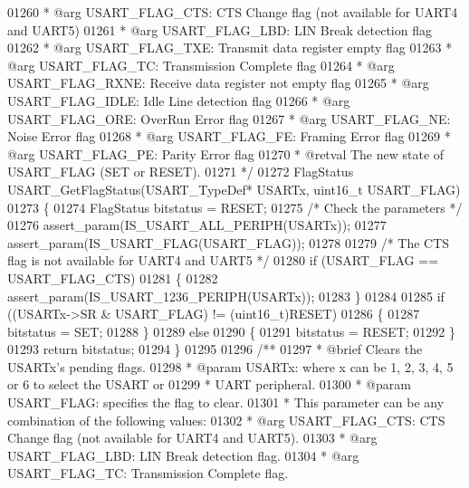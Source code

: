 \begin{DoxyCode}
01260 \textcolor{comment}{  *            @arg USART\_FLAG\_CTS:  CTS Change flag (not available for UART4 and UART5)}
01261 \textcolor{comment}{  *            @arg USART\_FLAG\_LBD:  LIN Break detection flag}
01262 \textcolor{comment}{  *            @arg USART\_FLAG\_TXE:  Transmit data register empty flag}
01263 \textcolor{comment}{  *            @arg USART\_FLAG\_TC:   Transmission Complete flag}
01264 \textcolor{comment}{  *            @arg USART\_FLAG\_RXNE: Receive data register not empty flag}
01265 \textcolor{comment}{  *            @arg USART\_FLAG\_IDLE: Idle Line detection flag}
01266 \textcolor{comment}{  *            @arg USART\_FLAG\_ORE:  OverRun Error flag}
01267 \textcolor{comment}{  *            @arg USART\_FLAG\_NE:   Noise Error flag}
01268 \textcolor{comment}{  *            @arg USART\_FLAG\_FE:   Framing Error flag}
01269 \textcolor{comment}{  *            @arg USART\_FLAG\_PE:   Parity Error flag}
01270 \textcolor{comment}{  * @retval The new state of USART\_FLAG (SET or RESET).}
01271 \textcolor{comment}{  */}
01272 FlagStatus USART_GetFlagStatus(USART\_TypeDef* USARTx, uint16\_t USART\_FLAG)
01273 \{
01274   FlagStatus bitstatus = RESET;
01275   \textcolor{comment}{/* Check the parameters */}
01276   assert_param(IS\_USART\_ALL\_PERIPH(USARTx));
01277   assert_param(IS\_USART\_FLAG(USART\_FLAG));
01278 
01279   \textcolor{comment}{/* The CTS flag is not available for UART4 and UART5 */}
01280   \textcolor{keywordflow}{if} (USART\_FLAG == USART_FLAG_CTS)
01281   \{
01282     assert_param(IS\_USART\_1236\_PERIPH(USARTx));
01283   \}
01284 
01285   \textcolor{keywordflow}{if} ((USARTx->SR & USART\_FLAG) != (uint16\_t)RESET)
01286   \{
01287     bitstatus = SET;
01288   \}
01289   \textcolor{keywordflow}{else}
01290   \{
01291     bitstatus = RESET;
01292   \}
01293   \textcolor{keywordflow}{return} bitstatus;
01294 \}
01295 
01296 \textcolor{comment}{/**}
01297 \textcolor{comment}{  * @brief  Clears the USARTx's pending flags.}
01298 \textcolor{comment}{  * @param  USARTx: where x can be 1, 2, 3, 4, 5 or 6 to select the USART or }
01299 \textcolor{comment}{  *         UART peripheral.}
01300 \textcolor{comment}{  * @param  USART\_FLAG: specifies the flag to clear.}
01301 \textcolor{comment}{  *          This parameter can be any combination of the following values:}
01302 \textcolor{comment}{  *            @arg USART\_FLAG\_CTS:  CTS Change flag (not available for UART4 and UART5).}
01303 \textcolor{comment}{  *            @arg USART\_FLAG\_LBD:  LIN Break detection flag.}
01304 \textcolor{comment}{  *            @arg USART\_FLAG\_TC:   Transmission Complete flag.}

\end{DoxyCode}
